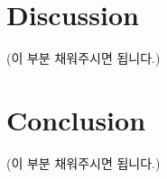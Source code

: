 \documentclass[openright, a4paper]{article}
\begin{document}
\section{Discussion}

(이 부분 채워주시면 됩니다.)

\section{Conclusion}

(이 부분 채워주시면 됩니다.)
\end{document}
